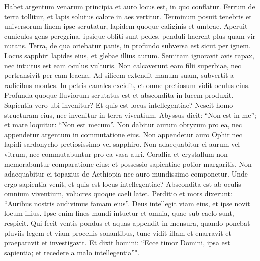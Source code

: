 \begin{biblechapter}  
\verse Habet argentum venarum principia et auro locus est, in quo conflatur. 
\verse Ferrum de terra tollitur, et lapis solutus calore in aes vertitur. 
\verse Terminum posuit tenebris et universorum finem ipse scrutatur, lapidem quoque caliginis et umbrae. 
\verse Aperuit cuniculos gens peregrina, ipsique obliti sunt pedes, penduli haerent plus quam vir nutans. 
\verse Terra, de qua oriebatur panis, in profundo subversa est sicut per ignem. 
\verse Locus sapphiri lapides eius, et glebae illius aurum. 
\verse Semitam ignoravit avis rapax, nec intuitus est eam oculus vulturis. 
\verse Non calcaverunt eam filii superbiae, nec pertransivit per eam leaena. 
\verse Ad silicem extendit manum suam, subvertit a radicibus montes. 
\verse In petris canales excidit, et omne pretiosum vidit oculus eius. 
\verse Profunda quoque fluviorum scrutatus est et abscondita in lucem produxit. 
\verse Sapientia vero ubi invenitur? Et quis est locus intellegentiae? 
\verse Nescit homo structuram eius, nec invenitur in terra viventium. 
\verse Abyssus dicit: “Non est in me”; et mare loquitur: “Non est mecum”. 
\verse Non dabitur aurum obryzum pro ea, nec appendetur argentum in commutatione eius. 
\verse Non appendetur auro Ophir nec lapidi sardonycho pretiosissimo vel sapphiro. 
\verse Non adaequabitur ei aurum vel vitrum, nec commutabuntur pro ea vasa auri. 
\verse Corallia et crystallum non memorabuntur comparatione eius; et possessio sapientiae potior margaritis. 
\verse Non adaequabitur ei topazius de Aethiopia nec auro mundissimo componetur. 
\verse Unde ergo sapientia venit, et quis est locus intellegentiae? 
\verse Abscondita est ab oculis omnium viventium, volucres quoque caeli latet. 
\verse Perditio et mors dixerunt: “Auribus nostris audivimus famam eius”. 
\verse Deus intellegit viam eius, et ipse novit locum illius. 
\verse Ipse enim fines mundi intuetur et omnia, quae sub caelo sunt, respicit. 
\verse Qui fecit ventis pondus et aquas appendit in mensura, 
\verse quando ponebat pluviis legem et viam procellis sonantibus, 
\verse tunc vidit illam et enarravit et praeparavit et investigavit. 
\verse Et dixit homini: “Ecce timor Domini, ipsa est sapientia; et recedere a malo intellegentia”". 
\end{biblechapter}

